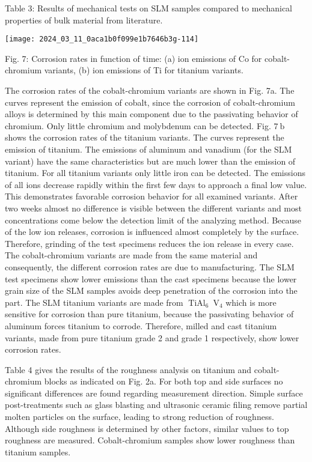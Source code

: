 \documentclass[10pt]{article}
\begin{document}
Table 3: Results of mechanical tests on SLM samples compared to mechanical properties of bulk material from literature.

\begin{center}
\texttt{[image: 2024\_03\_11\_0aca1b0f099e1b7646b3g-114]}
\end{center}

Fig. 7: Corrosion rates in function of time: (a) ion emissions of Co for cobalt-chromium variants, (b) ion emissions of Ti for titanium variants.

The corrosion rates of the cobalt-chromium variants are shown in Fig. 7a. The curves represent the emission of cobalt, since the corrosion of cobalt-chromium alloys is determined by this main component due to the passivating behavior of chromium. Only little chromium and molybdenum can be detected. Fig. $7 \mathrm{~b}$ shows the corrosion rates of the titanium variants. The curves represent the emission of titanium. The emissions of aluminum and vanadium (for the SLM variant) have the same characteristics but are much lower than the emission of titanium. For all titanium variants only little iron can be detected. The emissions of all ions decrease rapidly within the first few days to approach a final low value. This demonstrates favorable corrosion behavior for all examined variants. After two weeks almost no difference is visible between the different variants and most concentrations come below the detection limit of the analyzing method. Because of the low ion releases, corrosion is influenced almost completely by the surface. Therefore, grinding of the test specimens reduces the ion release in every case. The cobalt-chromium variants are made from the same material and consequently, the different corrosion rates are due to manufacturing. The SLM test specimens show lower emissions than the cast specimens because the lower grain size of the SLM samples avoids deep penetration of the corrosion into the part. The SLM titanium variants are made from $\operatorname{TiAl}_{6} \mathrm{~V}_{4}$ which is more sensitive for corrosion than pure titanium, because the passivating behavior of aluminum forces titanium to corrode. Therefore, milled and cast titanium variants, made from pure titanium grade 2 and grade 1 respectively, show lower corrosion rates.

Table 4 gives the results of the roughness analysis on titanium and cobalt-chromium blocks as indicated on Fig. 2a. For both top and side surfaces no significant differences are found regarding measurement direction. Simple surface post-treatments such as glass blasting and ultrasonic ceramic filing remove partial molten particles on the surface, leading to strong reduction of roughness. Although side roughness is determined by other factors, similar values to top roughness are measured. Cobalt-chromium samples show lower roughness than titanium samples.
\end{document}
